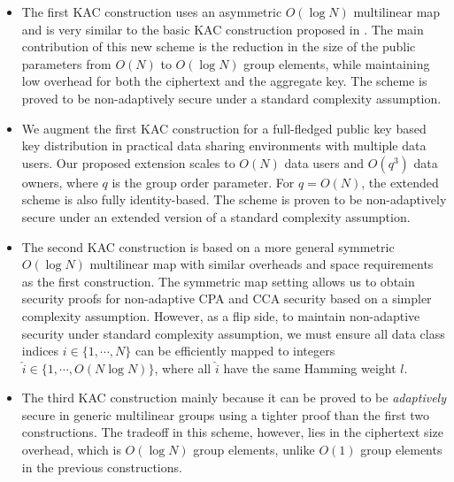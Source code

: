 \begin{itemize}
 \item The first KAC construction uses an asymmetric $O(\log N)$ multilinear map and is very similar to the basic KAC construction proposed in \cite{patranabis2015dynamic}. The main contribution of this new scheme is the reduction in the size of the public parameters from $O(N)$ to $O(\log N)$ group elements, while maintaining low overhead for both the ciphertext and the aggregate key. The scheme is proved to be non-adaptively secure under a standard complexity assumption.\\
 
 \item We augment the first KAC construction for a full-fledged public key based key distribution in practical data sharing environments with multiple data users. Our proposed extension scales to $O(N)$ data users and $O(q^3)$ data owners, where $q$ is the group order parameter. For $q=O(N)$, the extended scheme is also fully identity-based. The scheme is proven to be non-adaptively secure under an extended version of a standard complexity assumption.\\
 
 \item The second KAC construction is based on a more general symmetric $O(\log N)$ multilinear map with similar overheads and space requirements as the first construction. The symmetric map setting allows us to obtain security proofs for non-adaptive CPA and CCA security based on a simpler complexity assumption. However, as a flip side, to maintain non-adaptive security under standard complexity assumption, we must ensure all data class indices $i \in \{1,\cdots,N\}$ can be efficiently mapped to integers $\hat{i} \in \{1,\cdots,O(N\log N)\}$, where all $\hat{i}$ have the same Hamming weight $l$.\\
 
 \item The third KAC construction mainly because it can be proved to be \emph{adaptively} secure in generic multilinear groups using a tighter proof than the first two constructions. The tradeoff in this scheme, however, lies in the ciphertext size overhead, which is $O(\log N)$ group elements, unlike $O(1)$ group elements in the previous constructions.
 
\end{itemize}




